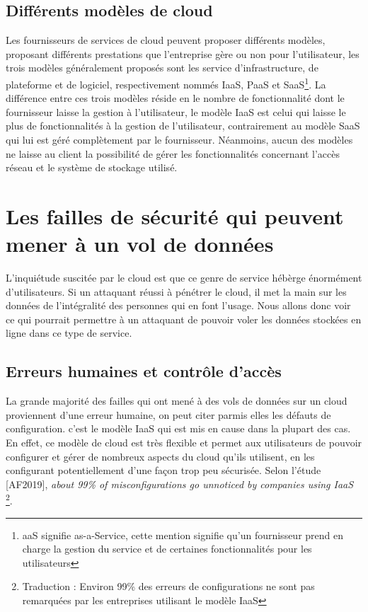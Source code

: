 \documentclass[a4paper, 12pt]{article}
\begin{document}
    \subsection{Différents modèles de cloud}
      Les fournisseurs de services de cloud peuvent proposer différents modèles,
      proposant différents prestations que l'entreprise gère ou non pour
      l'utilisateur, les trois modèles généralement proposés sont les service
      d'infrastructure, de plateforme et de logiciel, respectivement nommés
      IaaS, PaaS et SaaS\footnote{aaS signifie as-a-Service, cette mention
      signifie qu'un fournisseur prend en charge la gestion du service et de
      certaines fonctionnalités pour les utilisateurs}. La différence entre ces
      trois modèles réside en le nombre de fonctionnalité dont le fournisseur
      laisse la gestion à l'utilisateur, le modèle IaaS est celui qui laisse le
      plus de fonctionnalités à la gestion de l'utilisateur, contrairement au
      modèle SaaS qui lui est géré complètement par le fournisseur. Néanmoins,
      aucun des modèles ne laisse au client la possibilité de gérer les
      fonctionnalités concernant l'accès réseau et le système de stockage
      utilisé.

  \section{Les failles de sécurité qui peuvent mener à un vol de données}
    L'inquiétude suscitée par le cloud est que ce genre de service hébèrge
    énormément d'utilisateurs. Si un attaquant réussi à pénétrer le cloud, il
    met la main sur les données de l'intégralité des personnes qui en font
    l'usage. Nous allons donc voir ce qui pourrait permettre à un attaquant de
    pouvoir voler les données stockées en ligne dans ce type de service.

    \subsection{Erreurs humaines et contrôle d'accès}
      La grande majorité des failles qui ont mené à des vols de données sur un
      cloud proviennent d'une erreur humaine, on peut citer parmis elles les
      défauts de configuration. c'est le modèle IaaS qui est mis en cause dans
      la plupart des cas. En effet, ce modèle de cloud est très flexible et
      permet aux utilisateurs de pouvoir configurer et gérer de nombreux aspects
      du cloud qu'ils utilisent, en les configurant potentiellement d'une façon
      trop peu sécurisée. Selon l'étude [AF2019], \textit{about 99\% of
      misconfigurations go unnoticed by companies using IaaS}
      \footnote{Traduction : Environ 99\% des erreurs de configurations ne sont
      pas remarquées par les entreprises utilisant le modèle IaaS}. \\
\end{document}
